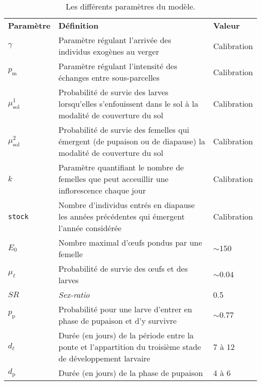     \begin{landscape}%
\begin{table}
\caption{Les différents paramètres du modèle.}
\label{tab:param}
\centering
{
\begin{tabular}{p{2cm}p{11.9cm}p{5cm}}
\textbf{Paramètre} & \textbf{Définition} & \textbf{Valeur}\\
$\gamma$ & Paramètre régulant l'arrivée des individus exogènes au verger & Calibration\\
$p_{\text{m}}$ & Paramètre régulant l'intensité des échanges entre sous-parcelles & Calibration\\
$\mu_{\text{sol}}^1$ & Probabilité de survie des larves lorsqu'elles s'enfouissent dans le sol à la modalité de couverture du sol & Calibration\\
$\mu_{\text{sol}}^2$ & Probabilité de survie des femelles qui émergent (de pupaison ou de diapause) la modalité de couverture du sol & Calibration\\
$k$ & Paramètre quantifiant le nombre de femelles que peut acceuillir une inflorescence chaque jour & Calibration\\
\texttt{stock} & Nombre d'individus entrés en diapause les années précédentes qui émergent l'année considérée & Calibration  \\
$E_0$ & Nombre maximal d'œufs pondus par une femelle & $\sim\!150$ \citep{paul}\\
$\mu_{\ell}$ & Probabilité de survie des œufs et des larves & $\sim\!0.04$ \citep{paul}\\
$\mathit{SR}$ & \textit{Sex-ratio} & 0.5 \citep{paul}\\
$p_{\text{p}}$ & Probabilité pour une larve d'entrer en phase de pupaison et d'y survivre & $\sim\! 0.77$ \citep{pauldiap}\\
$d_{\ell}$ & Durée (en jours) de la période entre la ponte et l'appartition du troisième stade de développement larvaire & 7 à 12 \citep{paul} \\
$d_{\text{p}}$ & Durée (en jours) de la phase de pupaison & 4 à 6 \citep{paul}
\end{tabular}
}
\end{table}
    \end{landscape}

